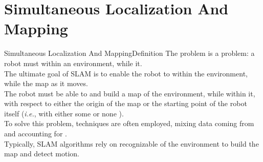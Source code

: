 
\section{Simultaneous Localization And Mapping}
\graphicspath{{figs/section3/}}

\begin{frame}{Simultaneous Localization And Mapping}{Definition}
	The  problem is a  problem: a robot must  within an environment, while  it.\\
	\bigskip
	The ultimate goal of SLAM is to enable the robot to  within the environment, while  the map as it moves.\\
	\bigskip
	The robot must be able to  and  build a map of the environment, while  within it, with respect to either the origin of the map or the starting point of the robot itself (\emph{i.e.}, with either some or none ).\\
	\bigskip
	To solve this problem,  techniques are often employed, mixing data coming from  and accounting for .\\
  \bigskip
  Typically, SLAM algorithms rely on recognizable  of the environment to build the map and detect motion.
\end{frame}
